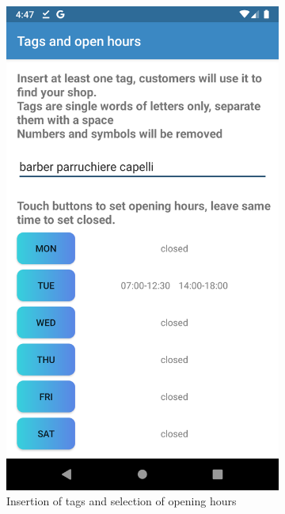 \begin{figure}[h]
\centering
\begin{subfigure}{.5\textwidth}
  \centering
  \includegraphics[height=.4\textheight, keepaspectratio=true]{Img/Screens/Registration_Shop2}
  \caption{Insertion of tags and selection of opening hours}
\end{subfigure}%
\begin{subfigure}{.5\textwidth}
  \centering

\end{subfigure}
\end{figure}
